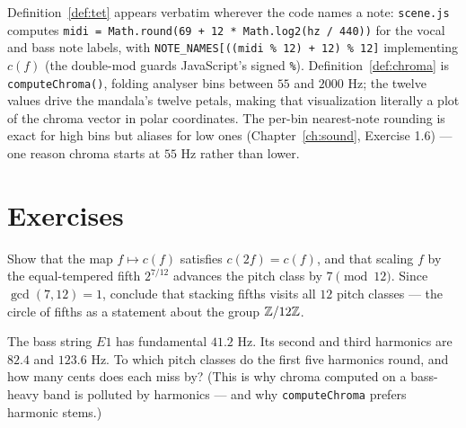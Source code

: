 \begin{incode}
Definition~\ref{def:tet} appears verbatim wherever the code names a note:
\texttt{scene.js} computes \texttt{midi = Math.round(69 + 12 *
Math.log2(hz / 440))} for the vocal and bass note labels, with
\texttt{NOTE\_NAMES[((midi \% 12) + 12) \% 12]} implementing $c(f)$ (the
double-mod guards JavaScript's signed \texttt{\%}). Definition~\ref{def:chroma}
is \texttt{computeChroma()}, folding analyser bins between $55$ and
$2000$ Hz; the twelve values drive the mandala's twelve petals, making that
visualization literally a plot of the chroma vector in polar coordinates.
The per-bin nearest-note rounding is exact for high bins but aliases for low
ones (Chapter~\ref{ch:sound}, Exercise 1.6) --- one reason chroma starts at
$55$ Hz rather than lower.
\end{incode}

\section*{Exercises}

\begin{exercise}
Show that the map $f \mapsto c(f)$ satisfies $c(2f) = c(f)$, and that scaling
$f$ by the equal-tempered fifth $2^{7/12}$ advances the pitch class by $7
\pmod{12}$. Since $\gcd(7, 12) = 1$, conclude that stacking fifths visits all
$12$ pitch classes --- the circle of fifths as a statement about the group
$\mathbb{Z}/12\mathbb{Z}$.
\end{exercise}

\begin{exercise}
The bass string $E1$ has fundamental $41.2$ Hz. Its second and third
harmonics are $82.4$ and $123.6$ Hz. To which pitch classes do the first
five harmonics round, and how many cents does each miss by? (This is why
chroma computed on a bass-heavy band is polluted by harmonics --- and why
\texttt{computeChroma} prefers harmonic stems.)
\end{exercise}

